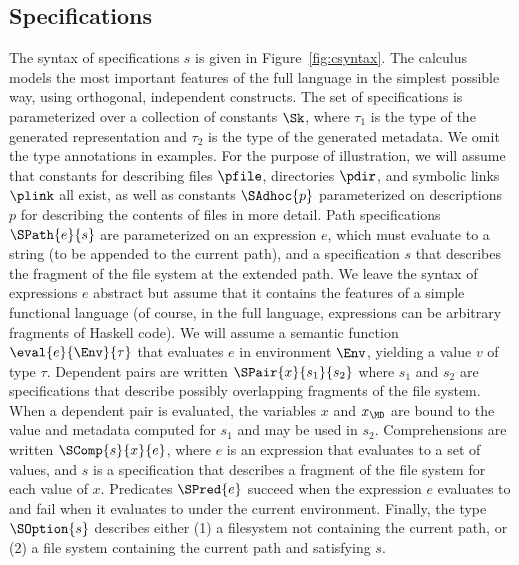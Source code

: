 \subsection{Specifications}

The syntax of specifications $s$ is given in
Figure~\ref{fig:csyntax}. The calculus models the most important
features of the full \forest{} language in the simplest possible way,
using orthogonal, independent constructs. The set of specifications is
parameterized over a collection of constants $\Sk$, 
where $\tau_1$ is the type of the generated representation and $\tau_2$ is
the type of the generated metadata. We omit the type annotations in
examples.  For the purpose of illustration, we
will assume that constants for describing files $\pfile$, directories
$\pdir$, and symbolic links $\plink$ all exist, as well as constants
$\SAdhoc{p}$ parameterized on \padshaskell{} descriptions $p$ for
describing the contents of files in more detail. Path specifications
$\SPath{e}{s}$ are parameterized on an expression $e$, which must
evaluate to a string (to be appended to the current path), and a
specification $s$ that describes the fragment of the file system at
the extended path. We leave the syntax of expressions $e$ abstract but
assume that it contains the features of a simple functional language
(of course, in the full \forest{} language, expressions can be
arbitrary fragments of Haskell code). We will assume a semantic
function $\eval{e}{\Env}{\tau}$ that evaluates $e$ in environment $\Env$, yielding
a value $v$ of type $\tau$. Dependent pairs are written
$\SPair{x}{s_1}{s_2}$ where $s_1$ and $s_2$ are specifications that
describe possibly overlapping fragments of the file system. When a
dependent pair is evaluated, the variables $x$ and $x_{\MD}$ are bound
to the value and metadata computed for $s_1$ and may be used in
$s_2$. Comprehensions are written $\SComp{s}{x}{e}$, where $e$ is an
expression that evaluates to a set of values, and $s$ is a
specification that describes a fragment of the file system for each
value of $x$.  Predicates $\SPred{e}$ succeed when the expression $e$
evaluates to \True{} and fail when it evaluates to \False{} under the
current environment.  Finally, the type $\SOption{s}$ describes
either (1) a filesystem not containing the current path, or (2)
a file system containing the current path and satisfying $s$. 

